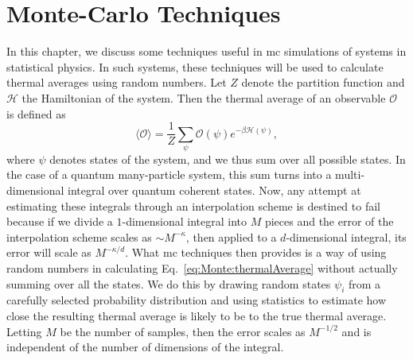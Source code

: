\chapter{Monte-Carlo Techniques}
\label{chap:Monte}
%
\noindent In this chapter, we discuss some techniques useful in \ac{mc} simulations
of systems in statistical physics.
In such systems, these techniques will be used to calculate thermal averages using random numbers. Let
$Z$ denote the partition function and $\mathcal{H}$ the Hamiltonian of the system. Then the thermal
average of an observable $\mathcal{O}$ is defined as
\begin{equation}
    \label{eq:Monte:thermalAverage}
    \langle\mathcal{O}\rangle = \frac{1}{Z}\sum_\psi\mathcal{O}(\psi)e^{-\beta\mathcal{H}(\psi)},
\end{equation}
where $\psi$ denotes states of the system, and we thus sum over all possible states. In the case of
a quantum many-particle system, this sum turns into a multi-dimensional integral over quantum coherent states.
Now, any attempt at estimating these integrals through an interpolation scheme is destined to fail because if we divide
a $1$-dimensional integral into $M$ pieces and the error of the interpolation scheme scales as $\sim M^{-\kappa}$,
then applied to a $d$-dimensional integral, its error will scale as $M^{-\kappa/d}$.
What \ac{mc} techniques then provides is a way of using random numbers in calculating
Eq.~\eqref{eq:Monte:thermalAverage} without actually summing over all the states. We do this by drawing random states
$\psi_i$ from a carefully selected probability distribution and using statistics to estimate how close the resulting
thermal average is likely to be to the true thermal average. Letting $M$ be the number of samples, then the
error scales as $M^{-1/2}$ and is independent of the number of dimensions of the integral.

